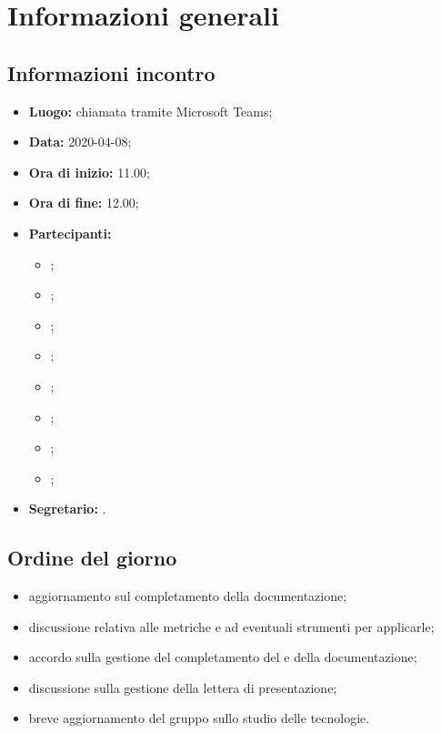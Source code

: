 \section{Informazioni generali}
\subsection{Informazioni incontro}
\begin{itemize}
	\item \textbf{Luogo:} chiamata tramite Microsoft Teams; 
	\item \textbf{Data:} 2020-04-08;
	\item \textbf{Ora di inizio:} 11.00; 
	\item \textbf{Ora di fine:} 12.00; 
	\item \textbf{Partecipanti:}
		\begin{itemize}
			\item \VB; 
			\item \LB; 
			\item \NF; 
			\item \EG; 
			\item \FJ; 
			\item \MP; 
			\item \AS; 
			\item \AZ; 
		\end{itemize}
	\item \textbf{Segretario:} \AS. 
\end{itemize}

\subsection{Ordine del giorno}
\begin{itemize}
	\item aggiornamento sul completamento della documentazione;
	\item discussione relativa alle metriche e ad eventuali strumenti per applicarle;
	\item accordo sulla gestione del completamento del \Glossario{} e della documentazione;
	\item discussione sulla gestione della lettera di presentazione;
	\item breve aggiornamento del gruppo sullo studio delle tecnologie.
\end{itemize}
